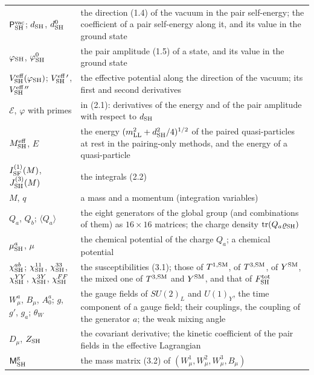 \documentclass[
  10pt,
]{article}
\begin{document}
\begin{longtable}[]{@{}
  >{\raggedright\arraybackslash}p{}
  >{\raggedright\arraybackslash}p{}@{}}
\(\mathsf P^{\rm vac}_{\rm SH}\); \(d_{\rm SH}\), \(d^0_{\rm SH}\) & the
direction (1.4) of the vacuum in the pair self-energy; the coefficient
of a pair self-energy along it, and its value in the ground state \\
\(\varphi_{\rm SH}\), \(\varphi^0_{\rm SH}\) & the pair amplitude (1.5)
of a state, and its value in the ground state \\
\(V^{\rm eff}_{\rm SH}(\varphi_{\rm SH})\);
\(V^{\rm eff\,\prime}_{\rm SH}\), \(V^{\rm eff\,\prime\prime}_{\rm SH}\)
& the effective potential along the direction of the vacuum; its first
and second derivatives \\
\(\mathcal E\), \(\varphi\) with primes & in (2.1): derivatives of the
energy and of the pair amplitude with respect to \(d_{\rm SH}\) \\
\(M^{\rm eff}_{\rm SH}\), \(E\) & the energy
\((m_{\rm LL}^2+d_{\rm SH}^2/4)^{1/2}\) of the paired quasi-particles at
rest in the pairing-only methods, and the energy of a quasi-particle \\
\(I^{(1)}_{\rm SF}(M)\), \(J^{(3)}_{\rm SH}(M)\) & the integrals
(2.2) \\
\(M\), \(q\) & a mass and a momentum (integration variables) \\
\(Q_a\), \(Q_b\); \(\langle Q_a\rangle\) & the eight generators of the
global group (and combinations of them) as \(16\times16\) matrices; the
charge density \(\mathrm{tr}(Q_a\varrho_{\rm SH})\) \\
\(\mu^a_{\rm SH}\), \(\mu\) & the chemical potential of the charge
\(Q_a\); a chemical potential \\
\(\chi^{ab}_{\rm SH}\); \(\chi^{11}_{\rm SH}\), \(\chi^{33}_{\rm SH}\),
\(\chi^{YY}_{\rm SH}\), \(\chi^{3Y}_{\rm SH}\), \(\chi^{FF}_{\rm SH}\) &
the susceptibilities (3.1); those of \(T^{1,{\rm SM}}\), of
\(T^{3,{\rm SM}}\), of \(Y^{\rm SM}\), the mixed one of
\(T^{3,{\rm SM}}\) and \(Y^{\rm SM}\), and that of
\(F^{\rm tot}_{\rm SH}\) \\
\(W^a_\mu\), \(B_\mu\), \(A^a_0\); \(g\), \(g'\), \(g_a\); \(\theta_W\)
& the gauge fields of \(SU(2)_L\) and \(U(1)_Y\), the time component of
a gauge field; their couplings, the coupling of the generator \(a\); the
weak mixing angle \\
\(D_\mu\), \(Z_{\rm SH}\) & the covariant derivative; the kinetic
coefficient of the pair fields in the effective Lagrangian \\
\(\mathsf M^{\rm g}_{\rm SH}\) & the mass matrix (3.2) of
\((W^1_\mu,W^2_\mu,W^3_\mu,B_\mu)\) \\

\end{longtable}
\end{document}
